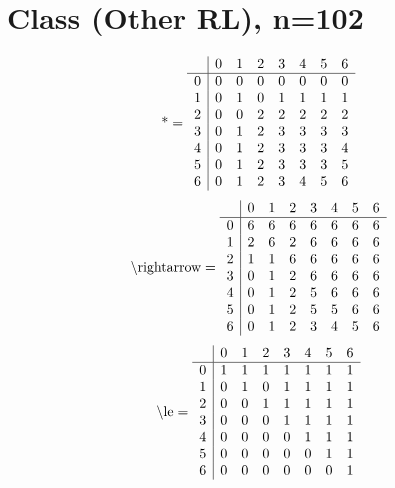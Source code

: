 \documentclass[11pt]{article}
\begin{document}
\section{Class (Other RL), n=102}
\[\text{*} = 
\begin{array}{r | r r r r r r r}
 & 0 & 1 & 2 & 3 & 4 & 5 & 6 \\ \hline
0 & 0 & 0 & 0 & 0 & 0 & 0 & 0 \\
1 & 0 & 1 & 0 & 1 & 1 & 1 & 1 \\
2 & 0 & 0 & 2 & 2 & 2 & 2 & 2 \\
3 & 0 & 1 & 2 & 3 & 3 & 3 & 3 \\
4 & 0 & 1 & 2 & 3 & 3 & 3 & 4 \\
5 & 0 & 1 & 2 & 3 & 3 & 3 & 5 \\
6 & 0 & 1 & 2 & 3 & 4 & 5 & 6 \\
\end{array}
\]
\[\text{\textbackslash rightarrow} = 
\begin{array}{r | r r r r r r r}
 & 0 & 1 & 2 & 3 & 4 & 5 & 6 \\ \hline
0 & 6 & 6 & 6 & 6 & 6 & 6 & 6 \\
1 & 2 & 6 & 2 & 6 & 6 & 6 & 6 \\
2 & 1 & 1 & 6 & 6 & 6 & 6 & 6 \\
3 & 0 & 1 & 2 & 6 & 6 & 6 & 6 \\
4 & 0 & 1 & 2 & 5 & 6 & 6 & 6 \\
5 & 0 & 1 & 2 & 5 & 5 & 6 & 6 \\
6 & 0 & 1 & 2 & 3 & 4 & 5 & 6 \\
\end{array}
\]
\[\text{\textbackslash le} = 
\begin{array}{r | r r r r r r r}
 & 0 & 1 & 2 & 3 & 4 & 5 & 6 \\ \hline
0 & 1 & 1 & 1 & 1 & 1 & 1 & 1 \\
1 & 0 & 1 & 0 & 1 & 1 & 1 & 1 \\
2 & 0 & 0 & 1 & 1 & 1 & 1 & 1 \\
3 & 0 & 0 & 0 & 1 & 1 & 1 & 1 \\
4 & 0 & 0 & 0 & 0 & 1 & 1 & 1 \\
5 & 0 & 0 & 0 & 0 & 0 & 1 & 1 \\
6 & 0 & 0 & 0 & 0 & 0 & 0 & 1 \\
\end{array}
\]
\end{document}
